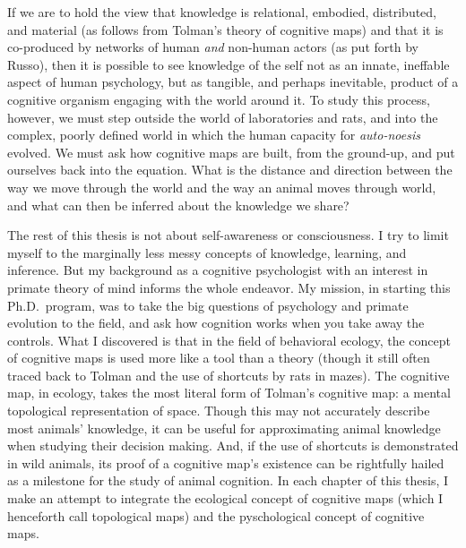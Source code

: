 \documentclass[twoside,12pt,final]{ucthesis-CA2012}
\begin{document}
\begin{ucmainmatter}
If we are to hold the view that knowledge is relational, embodied, distributed, and material (as follows from Tolman's theory of cognitive maps) and that it is co-produced by networks of human \emph{and} non-human actors (as put forth by Russo), then it is possible to see knowledge of the self not as an innate, ineffable aspect of human psychology, but as tangible, and perhaps inevitable, product of a cognitive organism engaging with the world around it. To study this process, however, we must step outside the world of laboratories and rats, and into the complex, poorly defined world in which the human capacity for \emph{auto-noesis} evolved. We must ask how cognitive maps are built, from the ground-up, and put ourselves back into the equation. What is the distance and direction between the way we move through the world and the way an animal moves through world, and what can then be inferred about the knowledge we share?

The rest of this thesis is not about self-awareness or consciousness. I try to limit myself to the marginally less messy concepts of knowledge, learning, and inference. But my background as a cognitive psychologist with an interest in primate theory of mind informs the whole endeavor. My mission, in starting this Ph.D.~program, was to take the big questions of psychology and primate evolution to the field, and ask how cognition works when you take away the controls. What I discovered is that in the field of behavioral ecology, the concept of cognitive maps is used more like a tool than a theory (though it still often traced back to Tolman and the use of shortcuts by rats in mazes). The cognitive map, in ecology, takes the most literal form of Tolman's cognitive map: a mental topological representation of space. Though this may not accurately describe most animals' knowledge, it can be useful for approximating animal knowledge when studying their decision making. And, if the use of shortcuts is demonstrated in wild animals, its proof of a cognitive map's existence can be rightfully hailed as a milestone for the study of animal cognition. In each chapter of this thesis, I make an attempt to integrate the ecological concept of cognitive maps (which I henceforth call topological maps) and the pyschological concept of cognitive maps.


\end{ucmainmatter}
\end{document}
